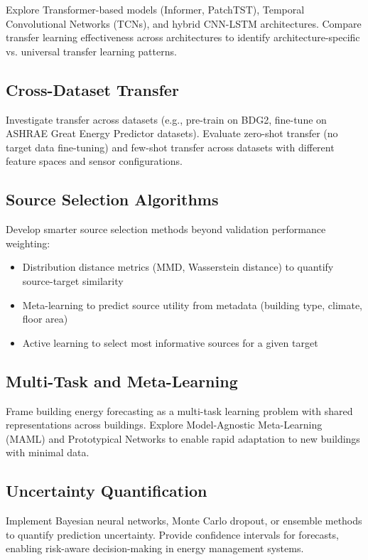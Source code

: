 \documentclass[12pt,a4paper]{report}
\begin{document}
Explore Transformer-based models (Informer, PatchTST), Temporal Convolutional Networks (TCNs), and hybrid CNN-LSTM architectures. Compare transfer learning effectiveness across architectures to identify architecture-specific vs. universal transfer learning patterns.

\subsection{Cross-Dataset Transfer}

Investigate transfer across datasets (e.g., pre-train on BDG2, fine-tune on ASHRAE Great Energy Predictor datasets). Evaluate zero-shot transfer (no target data fine-tuning) and few-shot transfer across datasets with different feature spaces and sensor configurations.

\subsection{Source Selection Algorithms}

Develop smarter source selection methods beyond validation performance weighting:

\begin{itemize}
    \item Distribution distance metrics (MMD, Wasserstein distance) to quantify source-target similarity
    \item Meta-learning to predict source utility from metadata (building type, climate, floor area)
    \item Active learning to select most informative sources for a given target
\end{itemize}

\subsection{Multi-Task and Meta-Learning}

Frame building energy forecasting as a multi-task learning problem with shared representations across buildings. Explore Model-Agnostic Meta-Learning (MAML) and Prototypical Networks to enable rapid adaptation to new buildings with minimal data.

\subsection{Uncertainty Quantification}

Implement Bayesian neural networks, Monte Carlo dropout, or ensemble methods to quantify prediction uncertainty. Provide confidence intervals for forecasts, enabling risk-aware decision-making in energy management systems.
\end{document}
